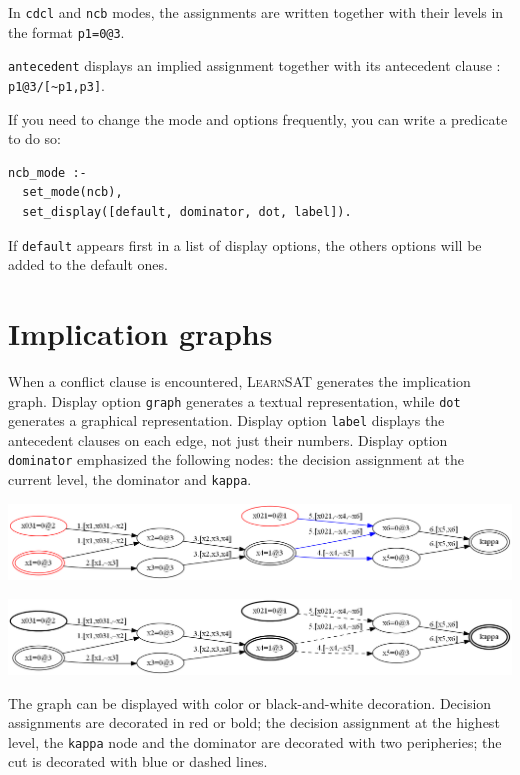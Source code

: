 \documentclass[11pt]{article}
\newcommand*{\p}[1]{\textup{\texttt{#1}}}
\newcommand*{\ls}{\textsc{LearnSAT}}
\begin{document}
In \p{cdcl} and \p{ncb} modes, the assignments are written together with
their levels in the format \p{p1=0@3}.

\p{antecedent} displays an implied assignment together with its
antecedent clause : \verb+p1@3/[~p1,p3]+.

If you need to change the mode and options frequently, you can write a
predicate to do so:

\begin{verbatim}
ncb_mode :-
  set_mode(ncb), 
  set_display([default, dominator, dot, label]).
\end{verbatim}

If \p{default} appears first in a list of display options, the
others options will be added to the default ones.

\newpage

\section{Implication graphs}\label{s.impl}

When a conflict clause is encountered, \ls{} generates the implication
graph. Display option \p{graph} generates a textual representation,
while \p{dot} generates a graphical representation. Display option
\p{label} displays the antecedent clauses on each edge, not just their
numbers. Display option \p{dominator} emphasized the following nodes:
the decision assignment at the current level, the dominator and
\p{kappa}.

\begin{center}
\includegraphics[keepaspectratio=true,width=.9\textwidth]{graph-color}

\bigskip

\includegraphics[keepaspectratio=true,width=.9\textwidth]{graph-bw}
\end{center}

The graph can be displayed with color or black-and-white decoration.
Decision assignments are decorated in red or bold; the decision
assignment at the highest level, the \p{kappa} node and the dominator
are decorated with two peripheries; the cut is decorated with blue or
dashed lines.
\end{document}
